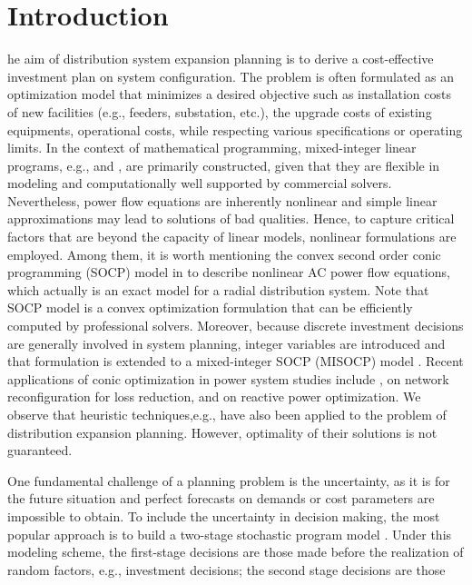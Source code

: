 \documentclass[journal]{IEEEtran}
\theoremstyle{remark}
\begin{document}
\section{Introduction}
he aim of distribution system expansion planning is to derive a cost-effective investment plan on system configuration. The problem is often formulated as an optimization model that minimizes a desired objective such as installation costs of  new facilities (e.g., feeders, substation, etc.), the upgrade costs of existing equipments, operational costs, while respecting various specifications or operating limits. In the context of mathematical programming, mixed-integer linear programs, e.g., \cite{Vaziri} and \cite{Haffner}, are primarily constructed, given that they are flexible in modeling and computationally well supported by commercial solvers. Nevertheless, power flow equations are inherently nonlinear and simple linear approximations may lead to solutions of bad qualities. Hence, to capture critical factors that are beyond the capacity of linear models, nonlinear formulations are employed. Among them, it is worth mentioning the convex second order conic programming (SOCP) model in \cite{jabr2008optimal} to describe nonlinear AC power flow equations, which actually is an exact model for a radial distribution system. Note that SOCP model is a convex optimization formulation that can be efficiently computed by professional solvers. Moreover, because discrete investment decisions are generally involved in system planning, integer variables are introduced and that formulation is extended to a mixed-integer SOCP (MISOCP) model \cite{jabr2013polyhedral}. Recent applications of conic optimization in power system studies include \cite{Taylor},\cite{Lee} on network reconfiguration for loss reduction, and \citep{Ding_SOCP} on reactive power optimization. We observe that heuristic techniques,e.g.,  \citep{Heurist_1,Heurist_2} have also been applied to the problem of distribution expansion planning. However,  optimality of their solutions is not guaranteed.\par
One fundamental challenge of a planning problem is the uncertainty, as it is for the future situation and perfect forecasts on demands or cost parameters are impossible to obtain. To include the uncertainty in decision making, the most popular approach is to build a two-stage stochastic program model \cite{birge2011introduction}. Under this modeling scheme, the first-stage decisions  are those made before the realization of random factors, e.g., investment decisions; the second stage decisions are those
\end{document}
